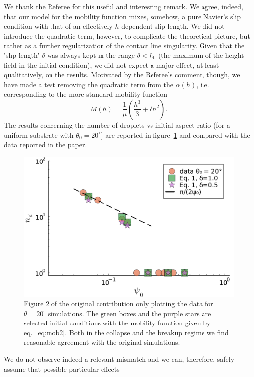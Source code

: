 \documentclass[12pt,english]{article}
\begin{document}
\begin{itemize}
{\item[ \textbf{Answer}]
{
We thank the Referee for this useful and interesting remark. We agree, indeed, that our model for the mobility 
function mixes, somehow, a pure Navier's slip condition with that of an effectively $h$-dependent slip length. 
We did not introduce the quadratic term, however, to complicate the theoretical picture, but rather as a further 
regularization of the contact line singularity. Given that the 'slip length' $\delta$ was always kept in the range 
$\delta < h_0$ (the maximum of the height field in the initial condition), we did not expect a major effect, 
at least qualitatively, on the results. Motivated by the Referee's comment, though, we have made a test removing 
the quadratic term from the $\alpha(h)$, i.e. corresponding to the more standard mobility function 
\begin{equation}\label{eq:mob2}
M(h)= \frac{1}{\mu}\left(\frac{h^3}{3} + \delta h^2\right).
\end{equation}
The results concerning the number of droplets vs initial aspect ratio (for a uniform substrate with $\theta_0 = 20^{\circ}$) are reported in figure~\ref{fig:diff_slip_20deg} and 
compared with the data reported in the paper.
\begin{figure}
    \centering
    \includegraphics[width=0.85\linewidth]{Ndrops_slip_model.pdf}
    \caption{Figure 2 of the original contribution only plotting the data for $\theta=20^{\circ}$ simulations.
    The green boxes and the purple stars are selected initial conditions with the mobility function given by eq.~\ref{eq:mob2}.
    Both in the collapse and the breakup regime we find reasonable agreement with the original simulations.
    }
    \label{fig:diff_slip_20deg}
\end{figure}
We do not observe indeed a relevant mismatch and we can, therefore, safely assume that possible particular effects 
}}
\end{itemize}
\end{document}
